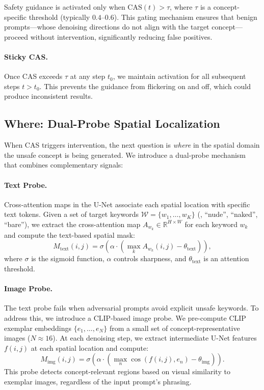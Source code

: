 Safety guidance is activated only when $\text{CAS}(t) > \tau$, where $\tau$ is a concept-specific threshold (typically $0.4$--$0.6$). This gating mechanism ensures that benign prompts---whose denoising directions do not align with the target concept---proceed without intervention, significantly reducing false positives.

\paragraph{Sticky CAS.} Once CAS exceeds $\tau$ at any step $t_0$, we maintain activation for all subsequent steps $t > t_0$. This prevents the guidance from flickering on and off, which could produce inconsistent results.

\subsection{Where: Dual-Probe Spatial Localization}
\label{subsec:where}

When CAS triggers intervention, the next question is \emph{where} in the spatial domain the unsafe concept is being generated. We introduce a dual-probe mechanism that combines complementary signals:

\paragraph{Text Probe.} Cross-attention maps in the U-Net associate each spatial location with specific text tokens. Given a set of target keywords $\mathcal{W} = \{w_1, \ldots, w_K\}$ (\eg, ``nude'', ``naked'', ``bare''), we extract the cross-attention map $A_{w_k} \in \mathbb{R}^{H \times W}$ for each keyword $w_k$ and compute the text-based spatial mask:
\begin{equation}
    M_\text{text}(i,j) = \sigma\left(\alpha \cdot \left(\max_k A_{w_k}(i,j) - \theta_\text{text}\right)\right),
    \label{eq:text_probe}
\end{equation}
where $\sigma$ is the sigmoid function, $\alpha$ controls sharpness, and $\theta_\text{text}$ is an attention threshold.

\paragraph{Image Probe.} The text probe fails when adversarial prompts avoid explicit unsafe keywords. To address this, we introduce a CLIP-based image probe. We pre-compute CLIP exemplar embeddings $\{e_1, \ldots, e_N\}$ from a small set of concept-representative images ($N \approx 16$). At each denoising step, we extract intermediate U-Net features $f(i,j)$ at each spatial location and compute:
\begin{equation}
    M_\text{img}(i,j) = \sigma\left(\alpha \cdot \left(\max_n \cos(f(i,j), e_n) - \theta_\text{img}\right)\right).
    \label{eq:img_probe}
\end{equation}
This probe detects concept-relevant regions based on visual similarity to exemplar images, regardless of the input prompt's phrasing.

